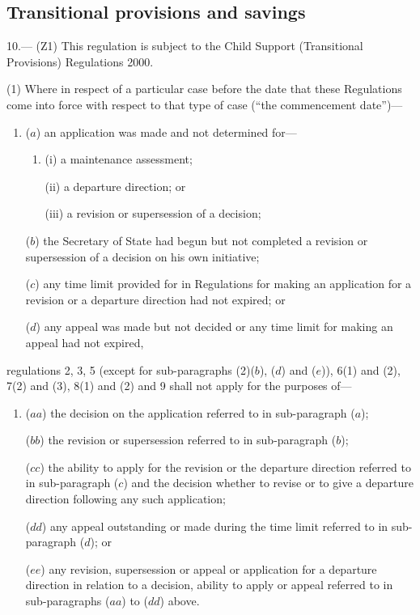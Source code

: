 \documentclass[12pt,a4paper]{article}
\begin{document}
\subsection[10. Transitional provisions and savings]{Transitional provisions and savings}

10.---%
(Z1) This regulation is subject to the Child Support (Transitional Provisions) Regulations 2000.

(1)  Where in respect of a particular case before the date that these Regulations come into force with respect to that type of case (“the commencement date”)—
\begin{enumerate}\item[]
($a$) an application was made and not determined for—
\begin{enumerate}\item[]
(i) a maintenance assessment;

(ii) a departure direction; or

(iii) a revision or supersession of a decision;
\end{enumerate}

($b$) the Secretary of State had begun but not completed a revision or supersession of a decision on his own initiative;

($c$) any time limit provided for in Regulations for making an application for a revision or a departure direction had not expired; or

($d$) any appeal was made but not decided or any time limit for making an appeal had not expired,
\end{enumerate}
regulations 2, 3, 5 (except for sub-paragraphs (2)($b$), ($d$)  and ($e$)), 6(1) and (2), 7(2) and (3), 8(1) and (2) and 9 shall not apply for the purposes of—
\begin{enumerate}\item[]
($aa$) the decision on the application referred to in sub-paragraph ($a$);

($bb$) the revision or supersession referred to in sub-paragraph ($b$);

($cc$) the ability to apply for the revision or the departure direction referred to in sub-paragraph ($c$)  and the decision whether to revise or to give a departure direction following any such application;

($dd$) any appeal outstanding or made during the time limit referred to in sub-paragraph ($d$); or

($ee$) any revision, supersession or appeal or application for a departure direction in relation to a decision, ability to apply or appeal referred to in sub-paragraphs ($aa$)  to ($dd$)  above.
\end{enumerate}
\end{document}
